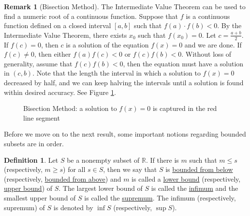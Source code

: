 \documentclass[12pt,letterpaper]{book}
\numberwithin{equation}{section}
\theoremstyle{definition}
\newtheorem{defi}[thm]{\textbf{Definition}}
\newtheorem{remark}[thm]{\textbf{Remark}}
\begin{document}
\begin{remark}[Bisection Method] The Intermediate Value Theorem can be used to find a numeric root of a continuous function. Suppose that $f$ is a continuous function defined on a closed interval $[a,b]$ such that $f(a)\cdot f(b)<0$. By the Intermediate Value Theorem, there exists $x_0$ such that $f(x_0)=0$. Let $c=\frac{a+b}{2}$. If $f(c)=0$, then $c$ is a solution of the equation $f(x)=0$ and we are done. If $f(c)\neq 0$, then either $f(a)f(c)<0$ or $f(c)f(b)<0$. Without loss of generality, assume that $f(c)f(b)<0$, then the equation must have a solution in $(c,b)$. Note that the length the interval in which a solution to $f(x)=0$ decreased by half, and we can keep halving the intervals until a solution is found within desired accuracy. See Figure \ref{bisection figure}.
\end{remark}

\begin{figure}[h]
\begin{center}
\caption{Bisection Method: a solution to $f(x)=0$ is captured in the red line segment}
\label{bisection figure}
\end{center}
\end{figure}

Before we move on to the next result, some important notions regarding bounded subsets are in order.

\begin{defi}
Let $S$ be a nonempty subset of $\mathbb{R}$. If there is $m$ such that $m\leq s$ (respectively, $m\geq s$) for all $s\in S$, then we say that $S$ is \underline{bounded from below} (respectively, \underline{bounded from above}) and $m$ is called a \underline{lower bound} (respectively, \underline{upper bound}) of $S$. The largest lower bound of $S$ is called the \underline{infimum} and the smallest upper bound of $S$ is called the \underline{supremum}. The infimum (respectively, supremum) of $S$ is denoted by $\inf S$ (respectively, $\sup S$).
\end{defi}
\end{document}

